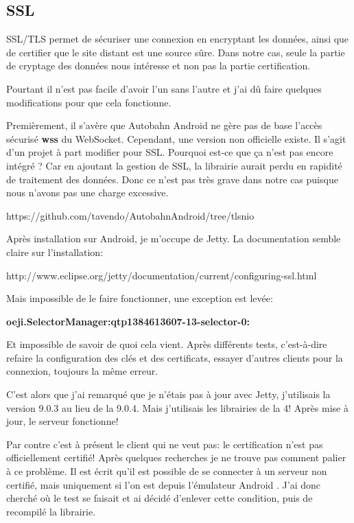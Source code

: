 \subsection{SSL}
SSL/TLS permet de sécuriser une connexion en encryptant les données, ainsi que de certifier que le site distant est une source sûre. Dans notre cas, seule la partie de cryptage des données nous intéresse et non pas la partie certification.

\medskip

Pourtant il n'est pas facile d'avoir l'un sans l'autre et j'ai dû faire quelques modifications pour que cela fonctionne.

\medskip

Premièrement, il s'avère que Autobahn Android ne gère pas de base l'accès sécurisé \textbf{wss} du WebSocket. Cependant, une version non officielle existe. Il s'agit d'un projet à part modifier pour SSL. Pourquoi est-ce que ça n'est pas encore intégré ? Car en ajoutant la gestion de SSL, la librairie aurait perdu en rapidité de traitement des données. Donc ce n'est pas très grave dans notre cas puisque nous n'avons pas une charge excessive.

https://github.com/tavendo/AutobahnAndroid/tree/tlsnio

\medskip

Après installation sur Android, je m'occupe de Jetty. La documentation semble claire sur l'installation:

http://www.eclipse.org/jetty/documentation/current/configuring-ssl.html

Mais impossible de le faire fonctionner, une exception est levée: 

\textbf{oeji.SelectorManager:qtp1384613607-13-selector-0:}

\medskip

Et impossible de savoir de quoi cela vient. Après différents tests, c'est-à-dire refaire la configuration des clés et des certificats, essayer d'autres clients pour la connexion, toujours la même erreur.

\medskip

C'est alors que j'ai remarqué que je n'étais pas à jour avec Jetty, j'utilisais la version 9.0.3 au lieu de la 9.0.4. Mais j'utilisais les librairies de la 4! Après mise à jour, le serveur fonctionne!

\medskip

Par contre c'est à présent le client qui ne veut pas: le certification n'est pas officiellement certifié! Après quelques recherches je ne trouve pas comment palier à ce problème. Il est écrit qu'il est possible de se connecter à un serveur non certifié, mais uniquement si l'on est depuis l'émulateur Android . J'ai donc cherché où le test se faisait et ai décidé d'enlever cette condition, puis de recompilé la librairie.

